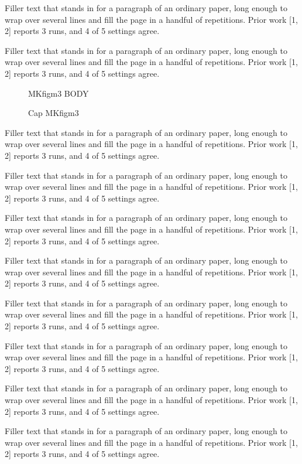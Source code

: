 \documentclass{article}
\begin{document}
Filler text that stands in for a paragraph of an ordinary paper, long enough to wrap over several lines and fill the page in a handful of repetitions. Prior work [1, 2] reports 3 runs, and 4 of 5 settings agree.\par
Filler text that stands in for a paragraph of an ordinary paper, long enough to wrap over several lines and fill the page in a handful of repetitions. Prior work [1, 2] reports 3 runs, and 4 of 5 settings agree.\par
\begin{figure}[t]\centering MKfigm3 BODY\caption{Cap MKfigm3}\label{fig:m3}\end{figure}
Filler text that stands in for a paragraph of an ordinary paper, long enough to wrap over several lines and fill the page in a handful of repetitions. Prior work [1, 2] reports 3 runs, and 4 of 5 settings agree.\par
Filler text that stands in for a paragraph of an ordinary paper, long enough to wrap over several lines and fill the page in a handful of repetitions. Prior work [1, 2] reports 3 runs, and 4 of 5 settings agree.\par
Filler text that stands in for a paragraph of an ordinary paper, long enough to wrap over several lines and fill the page in a handful of repetitions. Prior work [1, 2] reports 3 runs, and 4 of 5 settings agree.\par
Filler text that stands in for a paragraph of an ordinary paper, long enough to wrap over several lines and fill the page in a handful of repetitions. Prior work [1, 2] reports 3 runs, and 4 of 5 settings agree.\par
Filler text that stands in for a paragraph of an ordinary paper, long enough to wrap over several lines and fill the page in a handful of repetitions. Prior work [1, 2] reports 3 runs, and 4 of 5 settings agree.\par
Filler text that stands in for a paragraph of an ordinary paper, long enough to wrap over several lines and fill the page in a handful of repetitions. Prior work [1, 2] reports 3 runs, and 4 of 5 settings agree.\par
Filler text that stands in for a paragraph of an ordinary paper, long enough to wrap over several lines and fill the page in a handful of repetitions. Prior work [1, 2] reports 3 runs, and 4 of 5 settings agree.\par
Filler text that stands in for a paragraph of an ordinary paper, long enough to wrap over several lines and fill the page in a handful of repetitions. Prior work [1, 2] reports 3 runs, and 4 of 5 settings agree.\par
\end{document}
